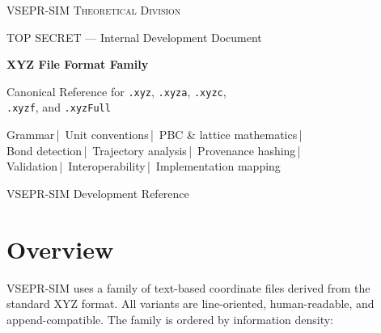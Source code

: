 \documentclass[11pt, a4paper, oneside]{article}
\begin{document}
\begin{titlepage}
  \centering
  \vspace*{1.2cm}
  {\large\scshape VSEPR-SIM Theoretical Division\par}
  \vspace{0.3cm}
  {\small TOP SECRET --- Internal Development Document\par}
  \vspace{1.2cm}
  {\Huge\bfseries XYZ File Format Family\par}
  \vspace{0.4cm}
  {\LARGE Canonical Reference for \texttt{.xyz}, \texttt{.xyza},
   \texttt{.xyzc},\\[0.2em]
   \texttt{.xyzf}, and \texttt{.xyzFull}\par}
  \vspace{1.0cm}
  {\normalsize
    Grammar\,|\,
    Unit conventions\,|\,
    PBC \& lattice mathematics\,|\,\\[0.3em]
    Bond detection\,|\,
    Trajectory analysis\,|\,
    Provenance hashing\,|\,\\[0.3em]
    Validation\,|\,
    Interoperability\,|\,
    Implementation mapping\par}
  \vspace{1.4cm}
  {\normalsize VSEPR-SIM Development Reference\par}
\end{titlepage}

\tableofcontents
\newpage

\section{Overview}
\label{sec:overview}

VSEPR-SIM uses a family of text-based coordinate files derived from the
standard XYZ format. All variants are line-oriented, human-readable, and
append-compatible. The family is ordered by information density:
\end{document}
